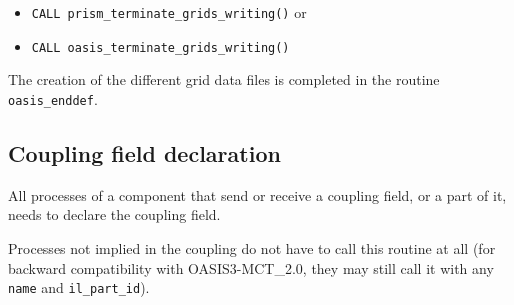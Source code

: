 \begin{itemize}
  \vspace{0.2cm}
\item {\tt CALL prism\_terminate\_grids\_writing()} or
\item {\tt CALL oasis\_terminate\_grids\_writing()}

\end{itemize}

The creation of the different grid data files is completed in the routine
{\tt oasis\_enddef}.

\subsection{Coupling field declaration}
\label{subsubsec_Declaration}

All processes of a component that send or receive a coupling field, or a part of it, needs to declare the coupling field.
 
Processes not implied in the
coupling do not have to call this routine at all (for backward
compatibility with OASIS3-MCT\_2.0, they may still call it with any {\tt name} and {\tt il\_part\_id}).

